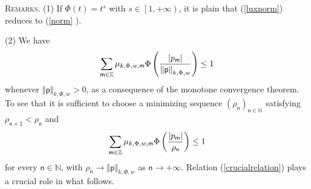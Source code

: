 \documentclass{article}
\begin{document}
\bigskip

\textsc{Remarks.} (1) If $\Phi \left( t\right) =t^{s}$ with $s\in \left[
1,+\infty \right) $, it is plain that (\ref{luxnorm}) reduces to (\ref{norm}%
).

(2) We have%
\begin{equation}
\sum_{\mathsf{m}\in \mathbb{Z}}\mu _{k,\Phi ,w,\mathsf{m}}\Phi \left( \frac{%
\left\vert p_{\mathsf{m}}\right\vert }{\left\Vert \mathsf{p}\right\Vert
_{k,\Phi ,w}}\right) \leq 1  \label{crucialrelation}
\end{equation}%
whenever $\left\Vert \mathsf{p}\right\Vert _{k,\Phi ,w}>0$, as a consequence
of the monotone convergence theorem. To see that it is sufficient to choose
a minimizing sequence $\left( \rho _{\mathsf{n}}\right) _{\mathsf{n}\in 
\mathbb{N}}$ satisfying $\rho _{\mathsf{n+1}}<\rho _{\mathsf{n}}$ and 
\begin{equation*}
\sum_{\mathsf{m}\in \mathbb{Z}}\mu _{k,\Phi ,w,\mathsf{m}}\Phi \left( \frac{%
\left\vert p_{\mathsf{m}}\right\vert }{\rho _{\mathsf{n}}}\right) \leq 1
\end{equation*}%
for every $\mathsf{n}\in \mathbb{N}$, with $\rho _{\mathsf{n}}\rightarrow
\left\Vert \mathsf{p}\right\Vert _{k,\Phi ,w}$ as $\mathsf{n\rightarrow
+\infty }$. Relation (\ref{crucialrelation}) plays a crucial role in what
follows.

\bigskip
\end{document}
